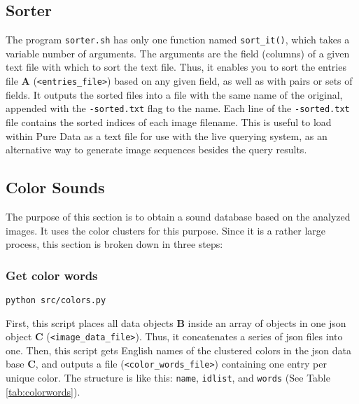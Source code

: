 \subsection{Sorter}

The program \texttt{sorter.sh} has only one function named \texttt{sort\_it()}, which takes a variable number of arguments. The arguments are the field (columns) of a given text file with which to sort the text file. Thus, it enables you to sort the entries file \textbf{A} (\texttt{<entries\_file>}) based on any given field, as well as with pairs or sets of fields. It outputs the sorted files into a file with the same name of the original, appended with the \texttt{-sorted.txt} flag to the name. Each line of the \texttt{-sorted.txt} file contains the sorted indices of each image filename. This is useful to load within Pure Data as a text file for use with the live querying system, as an alternative way to generate image sequences besides the query results.



\subsection{Color Sounds}

The purpose of this section is to obtain a sound database based on the analyzed images. It uses the color clusters for this purpose. Since it is a rather large process, this section is broken down in three steps:


\subsubsection{Get color words}

\texttt{python\ src/colors.py}

First, this script places all data objects \textbf{B} inside an array of objects in one \gls{json} object \textbf{C} (\texttt{<image\_data\_file>}). Thus, it concatenates a series of \gls{json} files into one. Then, this script gets English names of the clustered colors in the \gls{json} data base \textbf{C}, and outputs a file (\texttt{<color\_words\_file>}) containing one entry per unique color. The structure is like this: \texttt{name}, \texttt{idlist}, and \texttt{words} (See Table \ref{tab:colorwords}).


